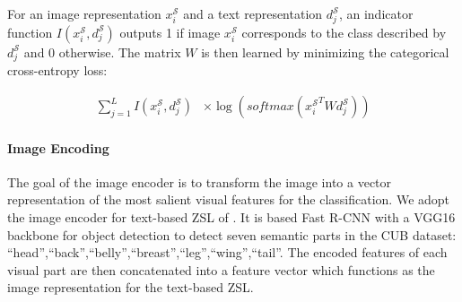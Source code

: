 \documentclass[11pt,a4paper]{article}
\newcommand\gal[1]{\textcolor{bright}{\textbf{GAL:} #1 }}
\newcommand\tzuf[1]{\textcolor{blue}{\textbf{TZUF:} #1 }}
\begin{document}

For an image representation $x_i^{\mathcal{S}}$ and a text representation $d^{\mathcal{S}}_j$, an indicator function $I(x_i^{\mathcal{S}},d^{\mathcal{S}}_j)$ outputs 1 if image $x_i^{\mathcal{S}}$ corresponds to the class described by $d^{\mathcal{S}}_j$ and 0 otherwise. 
The matrix $W$ is then learned by minimizing the categorical cross-entropy loss: 


\begin{equation}
\begin{split}
  \sum_{j=1}^{L}I(x_i^{\mathcal{S}},d^{\mathcal{S}}_j) 
  &\times\log(\textit{softmax}({x_i^{\mathcal{S}}}^TWd^{\mathcal{S}}_j))
\end{split}
\end{equation}






\paragraph{Image Encoding}
\label{section:Image_Encoder}
The goal of the image encoder is to transform the image into a vector representation of the most salient visual features for the classification. 
We adopt the image encoder for text-based ZSL of \citet{zhang2016spda, zhu2018generative,elhoseiny2017link}. It is based Fast R-CNN with \citep{girshick2015fast} a VGG16 backbone for object detection to detect seven semantic parts in the CUB dataset:
\enquote{head},\enquote{back},\enquote{belly},\enquote{breast},\enquote{leg},\enquote{wing},\enquote{tail}. 
The encoded features of each visual part are then concatenated into a feature vector which functions as the image representation for the text-based ZSL.
\end{document}

